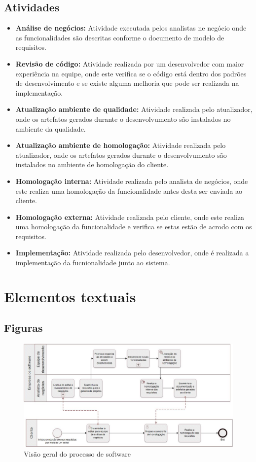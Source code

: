 \documentclass[	DIV=calc,%
							paper=a4,%
							fontsize=12pt,%
							onecolumn]{scrartcl}	 					%
\begin{document}
\subsection{Atividades}
\begin{itemize}
	\item \textbf{Análise de negócios:} Atividade executada pelos analistas ne negócio onde as funcionalidades são descritas conforme o documento de modelo de requisitos.
	\item \textbf{Revisão de código:} Atividade realizada por um desenvolvedor com maior experiência na equipe, onde este verifica se o código está dentro dos padrões
	de desenvolvimento e se existe alguma melhoria que pode ser realizada na implementação.
	\item \textbf{Atualização ambiente de qualidade:} Atividade realizada pelo atualizador, onde os artefatos gerados durante o desenvolvumento são instalados no ambiente
	da qualidade.
	\item \textbf{Atualização ambiente de homologação:} Atividade realizada pelo atualizador, onde os artefatos gerados durante o desenvolvumento são instalados no ambiente
	de homologação do cliente.
	\item \textbf{Homologação interna:} Atividade realizada pelo analista de negócios, onde este realiza uma homologação da funcionalidade antes desta ser enviada ao cliente.
	\item \textbf{Homologação externa:} Atividade realizada pelo cliente, onde este realiza uma homologação da funcionalidade e verifica se estas estão de acrodo com os requisitos.
	\item \textbf{Implementação:}  Atividade realizada pelo desenvolvedor, onde é realizada a implementação da fucnionalidade junto ao sistema.
\end{itemize}


\clearpage
\section{Elementos textuais}

\subsection{Figuras}

\begin{figure}
	\centering
	\includegraphics[width=\textwidth]{processo_de_software_BPMN1}
	\caption{Visão geral do processo de software}
\end{figure}
\end{document}
